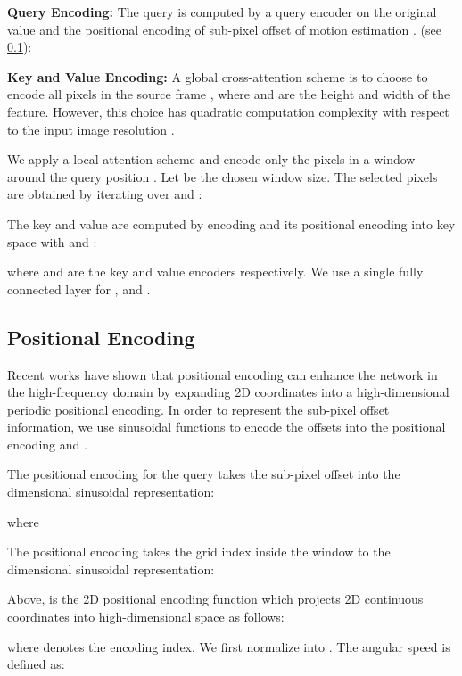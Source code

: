 \documentclass[10pt,twocolumn,letterpaper]{article}
\begin{document}
\vspace{0.5em}

\noindent\textbf{Query Encoding:}
The query  is computed by a query encoder  on the original value  and the positional encoding of sub-pixel offset of motion estimation .  (see \cref{sec:method_pe}):  


\vspace{0.5em}
\noindent\textbf{Key and Value Encoding:}
A global cross-attention scheme is to choose  to encode all pixels in the source frame , where  and  are the height and width of the feature. However, this choice has quadratic computation complexity with respect to the input image resolution .

We apply a local attention scheme and encode only the pixels in a window around the query position . Let  be the chosen window size. The selected pixels  are obtained by iterating over  and :


The key  and value  are computed by encoding  and its positional encoding into key space with  and :


where  and  are the key and value encoders respectively. We use a single fully connected layer for ,  and .


\subsection{Positional Encoding}\label{sec:method_pe}
Recent works \cite{xu2021ultrasr, mildenhall2021nerf} have shown that positional encoding can enhance the network in the high-frequency domain by expanding 2D coordinates into a high-dimensional periodic positional encoding.
In order to represent the sub-pixel offset information, we use sinusoidal functions to encode the offsets into the positional encoding  and .

The positional encoding for the query takes the sub-pixel offset into the  dimensional sinusoidal representation:



\noindent where



\noindent The positional encoding takes the grid index inside the window to the  dimensional sinusoidal representation:



\noindent Above,  is the 2D positional encoding function which projects 2D continuous coordinates into high-dimensional space as follows:



\noindent where  denotes the encoding index.
We first normalize  into . The angular speed is defined as:
\end{document}
